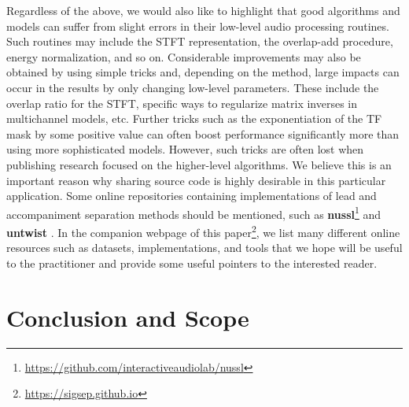 Regardless of the above, we would also like to highlight that good algorithms and models can suffer from slight errors in their low-level audio processing routines. Such routines may include the STFT representation, the overlap-add procedure, energy normalization, and so on. Considerable improvements may also be obtained by using simple tricks and, depending on the method, large impacts can occur in the results by only changing low-level parameters. These include
the overlap ratio for the STFT, specific ways to regularize matrix inverses in multichannel models, etc. Further tricks such as the exponentiation of the TF mask by some positive value can often boost performance significantly more than using more sophisticated models. However, such tricks are often lost when publishing research focused on the higher-level algorithms. We believe this is an important reason why sharing source code is highly desirable in this particular application. Some online repositories containing implementations of lead and accompaniment separation methods should be mentioned, such as \textbf{nussl}\footnote{\url{https://github.com/interactiveaudiolab/nussl}} and \textbf{untwist} \cite{roma16}. In the companion webpage of this paper\footnote{\url{https://sigsep.github.io}}, we list many different online resources such as datasets, implementations, and tools that we hope will be useful to the practitioner and provide some useful pointers to the interested reader.


\section{Conclusion and Scope}
